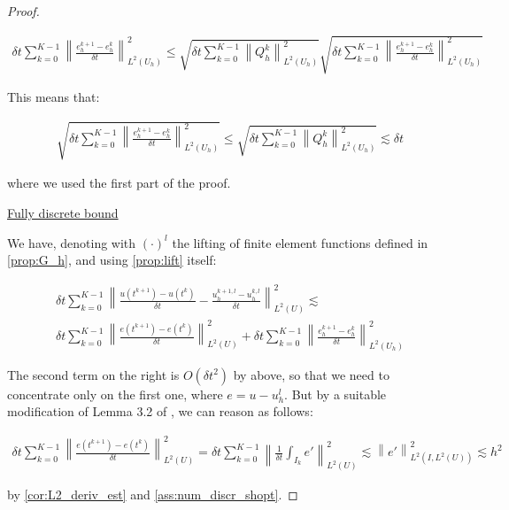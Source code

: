 \documentclass[english,a4paper,10pt,oneside]{scrbook}	%
\theoremstyle{break}
\newenvironment{mproof}[1][\proofname]{%
  \begin{proof}[#1]$ $\par\nobreak\ignorespaces
}{%
  \end{proof}
}
\renewcommand*{\proofname}{Proof}
\theoremstyle{remark}
\newcommand{\norm}[1]{\left\lVert#1\right\rVert}
\begin{document}
\begin{mproof}
\begin{align*}
\delta t \sum_{k=0}^{K-1}\norm{ \frac{e_{h}^{k+1}-e_h^k}{\delta t}}_{L^2(U_h)}^2 \leq  \sqrt{\delta t \sum_{k=0}^{K-1}\norm{Q_h^k}_{L^2(U_h)}^2}\sqrt{\delta t \sum_{k=0}^{K-1} \norm{\frac{e_{h}^{k+1}-e_h^k}{\delta t}}_{L^2(U_h)}^2}
\end{align*}

This means that:

\begin{align*}
\sqrt{\delta t \sum_{k=0}^{K-1} \norm{\frac{e_{h}^{k+1}-e_h^k}{\delta t}}_{L^2(U_h)}^2} \leq  \sqrt{\delta t \sum_{k=0}^{K-1}\norm{Q_h^k}_{L^2(U_h)}^2} \lesssim \delta t
\end{align*}

where we used the first part of the proof.

\underline{Fully discrete bound}

We have, denoting with $(\cdot)^l$ the lifting of finite element functions defined in \cref{prop:G_h}, and using \cref{prop:lift} itself:

\begin{align*}
	\delta t \sum_{k=0}^{K-1} \norm{\frac{u(t^{k+1})-u(t^k)}{\delta t} - \frac{u_h^{k+1,l}-u_h^{k, l}}{\delta t}}_{L^2(U)}^2\lesssim\\
	\delta t \sum_{k=0}^{K-1} \norm{\frac{e(t^{k+1})-e(t^k)}{\delta t}}_{L^2(U)}^2 +  \delta t \sum_{k=0}^{K-1} \norm{\frac{e_h^{k+1}-e_h^{k}}{\delta t}}_{L^2(U_h)}^2
\end{align*}

The second term on the right is $O(\delta t^2)$ by above, so that we need to concentrate only on the first one, where $e=u-u_h^l$. But by a suitable modification of Lemma 3.2 of \cite{lshou}, we can reason as follows:

\begin{align*}
\delta t \sum_{k=0}^{K-1} \norm{\frac{e(t^{k+1})-e(t^k)}{\delta t}}_{L^2(U)}^2 = \delta t \sum_{k=0}^{K-1} \norm{\frac{1}{\delta t}\int_{I_k}e'}_{L^2(U)}^2\lesssim \norm{e'}_{L^2(I,L^2(U))}^2\lesssim h^2
\end{align*}

by \cref{cor:L2_deriv_est} and \cref{ass:num_discr_shopt}.

\end{mproof}
\end{document}
